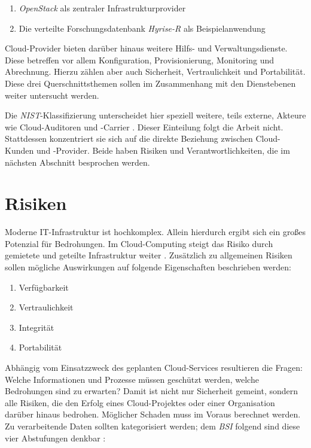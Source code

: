 \begin{enumerate}
	\item \emph{OpenStack} als zentraler Infrastrukturprovider
	\item Die verteilte Forschungsdatenbank \emph{Hyrise-R} als Beispielanwendung
\end{enumerate}

Cloud-Provider bieten darüber hinaus weitere Hilfs- und Verwaltungsdienste. Diese betreffen vor allem Konfiguration, Provisionierung, Monitoring und Abrechnung. Hierzu zählen aber auch Sicherheit, Vertraulichkeit und Portabilität. Diese drei Querschnittsthemen sollen im Zusammenhang mit den Dienstebenen weiter untersucht werden.

Die \emph{NIST}-Klassifizierung unterscheidet hier speziell weitere, teils externe, Akteure wie Cloud-Auditoren und -Carrier \cite{nist:2011:reference-architecture}. Dieser Einteilung folgt die Arbeit nicht. Stattdessen konzentriert sie sich auf die direkte Beziehung zwischen Cloud-Kunden und -Provider. Beide haben Risiken und Verantwortlichkeiten, die im nächsten Abschnitt besprochen werden.


\section{Risiken}

Moderne IT-Infrastruktur ist hochkomplex. Allein hierdurch ergibt sich ein großes Potenzial für Bedrohungen. Im Cloud-Computing steigt das Risiko durch gemietete und geteilte Infrastruktur weiter \cite{csa:2016:cloud-top-threats, Pearson:2010:issues-arising-cloud, 2011:takabi:security-challenges}. Zusätzlich zu allgemeinen Risiken sollen mögliche Auswirkungen auf folgende Eigenschaften beschrieben werden:

\begin{enumerate}
	\item Verfügbarkeit
	\item Vertraulichkeit
	\item Integrität
	\item Portabilität
\end{enumerate}

Abhängig vom Einsatzzweck des geplanten Cloud-Services resultieren die Fragen: Welche Informationen und Prozesse müssen geschützt werden, welche Bedrohungen sind zu erwarten? Damit ist nicht nur Sicherheit gemeint, sondern alle Risiken, die den Erfolg eines Cloud-Projektes oder einer Organisation darüber hinaus bedrohen. Möglicher Schaden muss im Voraus berechnet werden. Zu verarbeitende Daten sollten kategorisiert werden; dem \emph{BSI} folgend sind diese vier Abstufungen denkbar \cite{bsi:2014:Anforderungskatalog}:

